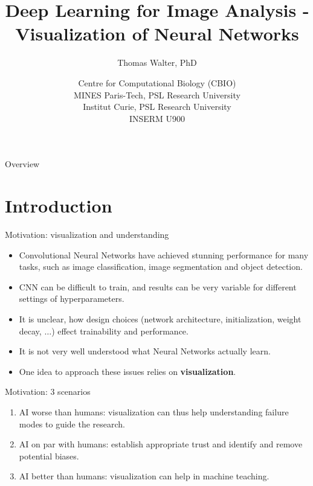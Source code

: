 \documentclass[xcolor=pdftex,dvipsnames,table]{beamer}
\title{Deep Learning for Image Analysis - \\ 
	   Visualization of Neural Networks}
\author{Thomas Walter, PhD}
\date{Centre for Computational Biology (CBIO) \\
	  MINES Paris-Tech, PSL Research University \\
	  Institut Curie, PSL Research University \\
	  INSERM U900}
\begin{document}
\begin{frame}
\titlepage
\end{frame}

\begin{frame}{Overview}
\tableofcontents
\end{frame}

\section{Introduction}

\begin{frame}{Motivation: visualization and understanding}
	\begin{itemize}
		\item Convolutional Neural Networks have achieved stunning performance for many tasks, such as image classification, image segmentation and object detection. 
		\item CNN can be difficult to train, and results can be very variable for different settings of hyperparameters. 
		\item It is unclear, how design choices (network architecture, initialization, weight decay, $\ldots$) effect trainability and performance. 
		\item It is not very well understood what Neural Networks actually learn. 
		\item One idea to approach these issues relies on {\bf visualization}.
	\end{itemize}
\end{frame}

\begin{frame}{Motivation: 3 scenarios}
\begin{enumerate}
	\item AI worse than humans: visualization can thus help understanding failure modes to guide the research.
	\item AI on par with humans: establish appropriate trust and identify and remove potential biases. 
	\item AI better than humans: visualization can help in machine teaching.
\end{enumerate}
\end{frame}
\end{document}
